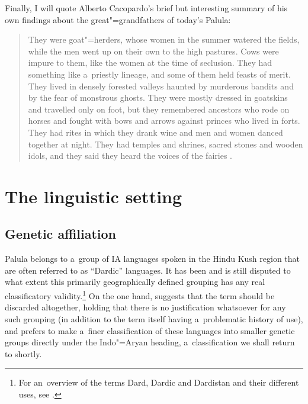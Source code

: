 Finally, I will quote Alberto Cacopardo's brief but interesting summary of his own findings about the great"=grandfathers of today's Palula:

\begin{quote}
They were goat"=herders, whose women in the summer watered the fields, while the men went up on their
own to the high pastures. Cows were impure to them, like the women at the time of seclusion. They
had something like a~priestly lineage, and some of them held feasts of merit. They lived in densely
forested valleys haunted by murderous bandits and by the fear of monstrous ghosts. They were mostly
dressed in goatskins and travelled only on foot, but they remembered ancestors who rode on horses
and fought with bows and arrows against princes who lived in forts. They had rites in which they
drank wine and men and women danced together at night. They had temples and shrines, sacred stones
and wooden idols, and they said they heard the voices of the fairies \citep[143]{cacopardo2001}.
\end{quote}

\section{The linguistic setting}
\label{sec:1-3}
\subsection{Genetic affiliation}
\label{subsec:1-3-1}
Palula belongs to a~group of IA languages spoken in the Hindu Kush region that are often referred to as ``Dardic'' languages. It has been and is still disputed to what extent this primarily geographically defined grouping has any real classificatory validity.\footnote{For an~overview of the terms Dard, Dardic and Dardistan and their different uses, see \citealt{mock1997}.} On the one hand, \citet[251]{strand2001} suggests that the term should be discarded altogether, holding that there is no justification whatsoever for any such grouping (in addition to the term itself having a~problematic history of use), and prefers to make a~finer classification of these languages into smaller genetic groups directly under the Indo"=Aryan heading, a~classification we shall return to shortly. 


